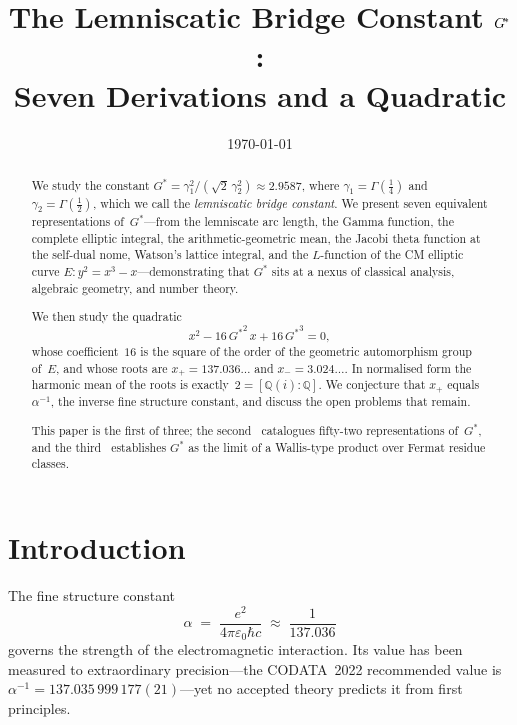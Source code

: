 \documentclass[12pt,reqno]{amsart}
\title[The Lemniscatic Bridge Constant]{%
  The Lemniscatic Bridge Constant $\Gstar$:\\[2pt]
  Seven Derivations and a Quadratic}
\author{}
\date{\today}
\theoremstyle{definition}
\theoremstyle{remark}
\newcommand{\QQ}{\mathbb{Q}}
\newcommand{\Gstar}{G^{\!*}}
\begin{document}
\begin{abstract}
We study the constant
$\Gstar = \gamma_{1}^{2}/(\sqrt{2}\,\gamma_{2}^{2}) \approx 2.9587$,
where $\gamma_{1}=\Gamma(\tfrac14)$ and $\gamma_{2}=\Gamma(\tfrac12)$,
which we call the \emph{lemniscatic bridge constant}.
We present seven equivalent representations of~$\Gstar$---from the lemniscate
arc length, the Gamma function, the complete elliptic integral, the
arithmetic-geometric mean, the Jacobi theta function at the self-dual nome,
Watson's lattice integral, and the $L$-function of the CM elliptic curve
$E\colon y^{2}=x^{3}-x$---demonstrating that $\Gstar$ sits at a nexus of
classical analysis, algebraic geometry, and number theory.

We then study the quadratic
\[
  x^{2} - 16\,{{\Gstar}}^{2}\,x + 16\,{{\Gstar}}^{3} = 0,
\]
whose coefficient~$16$ is the square of the order of the geometric
automorphism group of~$E$, and whose roots are
$x_{+}=137.036\ldots$ and $x_{-}=3.024\ldots$.
In normalised form the harmonic mean of the roots is
exactly~$2 = [\QQ(i):\QQ]$.  We conjecture that $x_{+}$ equals
$\alpha^{-1}$, the inverse fine structure constant, and discuss the open
problems that remain.

This paper is the first of three; the second~\cite{Paper2} catalogues
fifty-two representations of~$\Gstar$, and the third~\cite{Paper3} establishes
$\Gstar$ as the limit of a Wallis-type product over Fermat residue classes.
\end{abstract}

\maketitle
\tableofcontents

\section{Introduction}\label{sec:intro}

The fine structure constant
\begin{equation}\label{eq:alpha}
  \alpha \;=\; \frac{e^{2}}{4\pi\varepsilon_{0}\hbar c}
  \;\approx\; \frac{1}{137.036}
\end{equation}
governs the strength of the electromagnetic interaction.  Its value has been
measured to extraordinary precision---the CODATA~2022 recommended value is
$\alpha^{-1} = 137.035\,999\,177(21)$---yet no accepted theory predicts it from
first principles.
\end{document}
